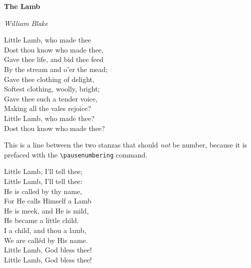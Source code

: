 \documentclass{memoir}
\begin{document}
\textbf{The Lamb}

\emph{William Blake}

\begingroup
\beginnumbering
\autopar
{}

Little Lamb, who made thee\\
Dost thou know who made thee,\\
Gave thee life, and bid thee feed\\
By the stream and o'er the mead;\\
Gave thee clothing of delight,\\
Softest clothing, woolly, bright;\\
Gave thee such a tender voice,\\
Making all the vales rejoice?\\
Little Lamb, who made thee?\\
Dost thou know who made thee?

\pausenumbering

This is a line between the two stanzas that should \emph{not} be number, because it is prefaced with the \verb|\pausenumbering| command.

\resumenumbering

Little Lamb, I'll tell thee;\\
Little Lamb, I'll tell thee:\\
He is called by thy name,\\
For He calls Himself a Lamb\\
He is meek, and He is mild,\\
He became a little child.\\
I a child, and thou a lamb,\\
We are call\'ed by His name.\\
Little Lamb, God bless thee!\\
Little Lamb, God bless thee!

\endnumbering
\endgroup
\end{document}
